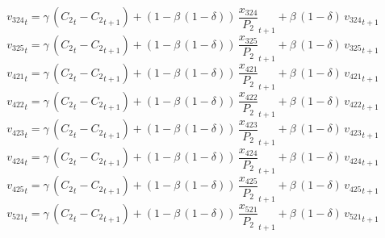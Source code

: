 \begin{dmath}
{{v_{324}}}_{t}={{\gamma}}\, \left({{C_{2}}}_{t}-{{C_{2}}}_{t+1}\right)+\left(1-{{\beta}}\, \left(1-{{\delta}}\right)\right)\, {{\frac{x_{324}}{P_{2}}}}_{t+1}+{{\beta}}\, \left(1-{{\delta}}\right)\, {{v_{324}}}_{t+1}
\end{dmath}
\begin{dmath}
{{v_{325}}}_{t}={{\gamma}}\, \left({{C_{2}}}_{t}-{{C_{2}}}_{t+1}\right)+\left(1-{{\beta}}\, \left(1-{{\delta}}\right)\right)\, {{\frac{x_{325}}{P_{2}}}}_{t+1}+{{\beta}}\, \left(1-{{\delta}}\right)\, {{v_{325}}}_{t+1}
\end{dmath}
\begin{dmath}
{{v_{421}}}_{t}={{\gamma}}\, \left({{C_{2}}}_{t}-{{C_{2}}}_{t+1}\right)+\left(1-{{\beta}}\, \left(1-{{\delta}}\right)\right)\, {{\frac{x_{421}}{P_{2}}}}_{t+1}+{{\beta}}\, \left(1-{{\delta}}\right)\, {{v_{421}}}_{t+1}
\end{dmath}
\begin{dmath}
{{v_{422}}}_{t}={{\gamma}}\, \left({{C_{2}}}_{t}-{{C_{2}}}_{t+1}\right)+\left(1-{{\beta}}\, \left(1-{{\delta}}\right)\right)\, {{\frac{x_{422}}{P_{2}}}}_{t+1}+{{\beta}}\, \left(1-{{\delta}}\right)\, {{v_{422}}}_{t+1}
\end{dmath}
\begin{dmath}
{{v_{423}}}_{t}={{\gamma}}\, \left({{C_{2}}}_{t}-{{C_{2}}}_{t+1}\right)+\left(1-{{\beta}}\, \left(1-{{\delta}}\right)\right)\, {{\frac{x_{423}}{P_{2}}}}_{t+1}+{{\beta}}\, \left(1-{{\delta}}\right)\, {{v_{423}}}_{t+1}
\end{dmath}
\begin{dmath}
{{v_{424}}}_{t}={{\gamma}}\, \left({{C_{2}}}_{t}-{{C_{2}}}_{t+1}\right)+\left(1-{{\beta}}\, \left(1-{{\delta}}\right)\right)\, {{\frac{x_{424}}{P_{2}}}}_{t+1}+{{\beta}}\, \left(1-{{\delta}}\right)\, {{v_{424}}}_{t+1}
\end{dmath}
\begin{dmath}
{{v_{425}}}_{t}={{\gamma}}\, \left({{C_{2}}}_{t}-{{C_{2}}}_{t+1}\right)+\left(1-{{\beta}}\, \left(1-{{\delta}}\right)\right)\, {{\frac{x_{425}}{P_{2}}}}_{t+1}+{{\beta}}\, \left(1-{{\delta}}\right)\, {{v_{425}}}_{t+1}
\end{dmath}
\begin{dmath}
{{v_{521}}}_{t}={{\gamma}}\, \left({{C_{2}}}_{t}-{{C_{2}}}_{t+1}\right)+\left(1-{{\beta}}\, \left(1-{{\delta}}\right)\right)\, {{\frac{x_{521}}{P_{2}}}}_{t+1}+{{\beta}}\, \left(1-{{\delta}}\right)\, {{v_{521}}}_{t+1}
\end{dmath}

